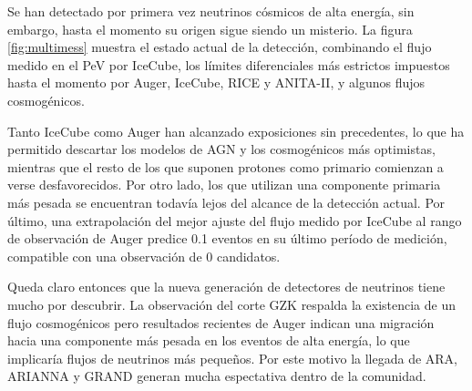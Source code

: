 	Se han detectado por primera vez neutrinos c\'osmicos de alta energ\'ia, sin embargo, hasta el momento su origen sigue siendo un misterio.
	La figura \ref{fig:multimess} muestra el estado actual de la detecci\'on, combinando el flujo medido en el PeV por IceCube, los l\'imites diferenciales más estrictos impuestos hasta el momento por Auger, IceCube, RICE y ANITA-II, y algunos flujos cosmog\'enicos.
	
	Tanto IceCube como Auger han alcanzado exposiciones sin precedentes, lo que ha permitido descartar los modelos de AGN y los cosmog\'enicos m\'as optimistas, mientras que el resto de los que suponen protones como primario comienzan a verse desfavorecidos.
	Por otro lado, los que utilizan una componente primaria m\'as pesada se encuentran todav\'ia lejos del alcance de la detecci\'on actual.
	Por \'ultimo, una extrapolaci\'on del mejor ajuste del flujo medido por IceCube al rango de observaci\'on de Auger predice 0.1 eventos en su \'ultimo per\'iodo de medici\'on, compatible con una observaci\'on de 0 candidatos.
	
	Queda claro entonces que la nueva generaci\'on de detectores de neutrinos tiene mucho por descubrir.
	La observaci\'on del corte GZK respalda la existencia de un flujo cosmog\'enicos pero resultados recientes de Auger indican una migraci\'on hacia una componente m\'as pesada en los eventos de alta energ\'ia, lo que implicar\'ia flujos de neutrinos m\'as peque\~nos.
	Por este motivo la llegada de ARA, ARIANNA y GRAND generan mucha espectativa dentro de la comunidad.
	\fi %

% 	
	

